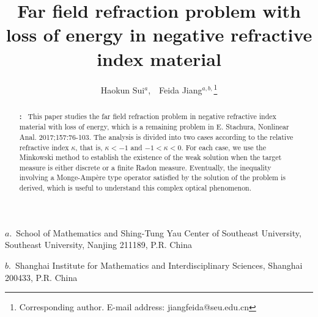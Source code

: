 \documentclass[a4paper,12pt,]{article}
\numberwithin{equation}{section}
\numberwithin{equation}{section} \allowdisplaybreaks
\begin{document}
\title {\LARGE \bf Far field refraction problem with loss of energy in negative refractive index material}

\author{{Haokun Sui$^{a}$,~~Feida Jiang$^{a,b,}$\thanks{Corresponding author.
E-mail address: jiangfeida@seu.edu.cn}}}
\maketitle
\begin{center}
\begin{minipage}{12cm}
\begin{description}
\item \small
 $a$.~School of Mathematics and Shing-Tung Yau Center of Southeast University, Southeast University, Nanjing 211189, P.R. China
 \item \small
$b$.~Shanghai Institute for Mathematics and Interdisciplinary Sciences, Shanghai 200433, P.R. China
\end{description}
\end{minipage}
\end{center}


	
	
	
	
	
	
	
\begin{abstract}{\bf:}{\footnotesize
~This paper studies the far field refraction problem in negative refractive index material with loss of energy, which is a remaining problem in E. Stachura, Nonlinear Anal. 2017;157:76-103. The analysis is divided into two cases according to the relative refractive index $\kappa$, that is, $\kappa<-1$ and $-1<\kappa<0$. For each case, we use the Minkowski method to establish the existence of the weak solution when the target measure is either discrete or a finite Radon measure. Eventually, the inequality involving a Monge-Amp\`ere type operator satisfied by the solution of the problem is derived, which is useful to understand this complex optical phenomenon.}		
\end{abstract}
	
\end{document}
